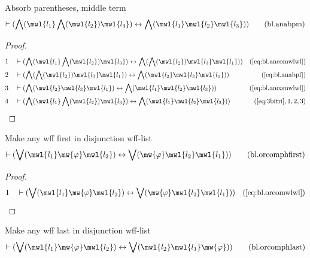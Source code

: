 \begin{lemma} {Absorb parentheses, middle term}
\begin{align}
\vdash ( \bigwedge( \mwl{l_1} \bigwedge( \mwl{l_2} ) \mwl{l_3} )
    \leftrightarrow \bigwedge( \mwl{l_1} \mwl{l_2} \mwl{l_3} )
    )\label{eq:bl.anabpm}\tag{bl.anabpm}
\end{align}
\end{lemma}


\begin{proof}
\begin{align}
  1 &&  & \vdash ( \bigwedge( \mwl{l_1} \bigwedge( \mwl{l_2} ) \mwl{l_3} )
     \leftrightarrow \bigwedge( \bigwedge( \mwl{l_2} )
     \mwl{l_3} \mwl{l_1} )
     )&(\mbox{\ref{eq:bl.ancomwlwl}})\notag
  \\ 2 &&  & \vdash ( \bigwedge( \bigwedge( \mwl{l_2} ) \mwl{l_3} \mwl{l_1} )
     \leftrightarrow \bigwedge( \mwl{l_2} \mwl{l_3}
     \mwl{l_1} ) )&(\mbox{\ref{eq:bl.anabpf}})\notag
  \\ 3 &&  & \vdash ( \bigwedge( \mwl{l_2} \mwl{l_3} \mwl{l_1} )
     \leftrightarrow \bigwedge( \mwl{l_1} \mwl{l_2}
     \mwl{l_3} ) )&(\mbox{\ref{eq:bl.ancomwlwl}})\notag
  \\ 4 &&  & \vdash ( \bigwedge( \mwl{l_1} \bigwedge( \mwl{l_2} ) \mwl{l_3} )
     \leftrightarrow \bigwedge( \mwl{l_1} \mwl{l_2}
     \mwl{l_3} ) )&(\mbox{\ref{eq:3bitri}},1,2,3)\notag
\end{align}
\end{proof}

\begin{lemma} {Make any wff first in disjunction
wff-list}
\begin{align}
\vdash ( \bigvee( \mwl{l_1} \mw{\varphi} \mwl{l_2} ) \leftrightarrow \bigvee(
    \mw{\varphi} \mwl{l_2} \mwl{l_1} )
    )\label{eq:bl.orcomphfirst}\tag{bl.orcomphfirst}
\end{align}
\end{lemma}


\begin{proof}
\begin{align}
  1 &&  & \vdash ( \bigvee( \mwl{l_1} \mw{\varphi} \mwl{l_2} ) \leftrightarrow
     \bigvee( \mw{\varphi} \mwl{l_2} \mwl{l_1} )
     )&(\mbox{\ref{eq:bl.orcomwlwl}})\notag
\end{align}
\end{proof}

\begin{lemma} {Make any wff last in disjunction
wff-list}
\begin{align}
\vdash ( \bigvee( \mwl{l_1} \mw{\varphi} \mwl{l_2} ) \leftrightarrow \bigvee(
    \mwl{l_2} \mwl{l_1} \mw{\varphi} )
    )\label{eq:bl.orcomphlast}\tag{bl.orcomphlast}
\end{align}
\end{lemma}


